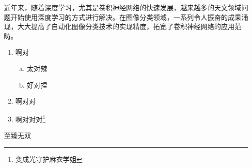 \documentclass[12pt,a4paper]{article}%
\begin{document}
近年来，随着深度学习，尤其是卷积神经网络的快速发展，越来越多的天文领域问题开始使用深度学习的方式进行解决。在图像分类领域，一系列令人振奋的成果涌现，大大提高了自动化图像分类技术的实现精度，拓宽了卷积神经网络的应用范畴。


\begin{enumerate}[1.]%
    \item 啊对
          \begin{enumerate}[(a)]%
              \item 太对辣
              \item 好对捏
          \end{enumerate}
    \item 啊对对
    \item 啊对对对\footnote{变成光守护麻衣学姐}%
\end{enumerate}

至臻无双 \cite{remillard_x-ray_2006}

\newpage



\end{document}
